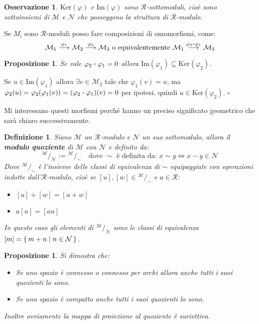 \documentclass[10pt, twoside=false, x11names]{scrbook}
\newtheorem{proposition}[theorem]{Proposizione}
\newtheorem{osservation}[theorem]{Osservazione}
\newtheorem{definition}[theorem]{Definizione}
\newenvironment{proof}{{\textbf{Dimostrazione}:}}{\hfill $\square$}
\newcommand{\R}{\mathcal{R}}
\newcommand{\M}{\mathcal{M}}
\newcommand{\N}{\mathcal{N}}
\newcommand{\im}[1]{\mathrm{Im}( #1 )}
\renewcommand{\ker}[1]{\mathrm{Ker}( #1)}
\newcommand*\quot[2]{{^{\textstyle #1}\big/_{\textstyle #2}}}
\let\latexcirc=\circ
\newcommand{\ccirc}{\mathbin{\mathchoice
  {\xcirc\scriptstyle}
  {\xcirc\scriptstyle}
  {\xcirc\scriptscriptstyle}
  {\xcirc\scriptscriptstyle}
}}
\newcommand{\xcirc}[1]{\vcenter{\hbox{$#1\latexcirc$}}}
\let\circ\ccirc
\let\phi\varphi
\begin{document}
\begin{osservation}
  $ \ker{\phi} $ e $ \im{\phi} $ sono $ \R $-sottomoduli, cioè sono sottoinsiemi di $ \M $ e $ \N $
  che posseggono la struttura di $ \R $-modulo.
\end{osservation}

Se $ M_i $ sono $ \R $-moduli posso fare composizioni di omomorfismi, come:
\[
  \M_1 \overset{\phi_1}{\longrightarrow}  \M_2 \overset{\phi_2}{\longrightarrow}  \M_3
  \text{ o equivalentemente }
  \M_1 \overset{\phi_2 \circ \phi_1}{\longrightarrow} \M_3
\]

\begin{proposition}
  Se vale $ \phi_2 \circ \phi_1 = 0 $ allora $ \im{\phi_1} \subseteq \ker{\phi_2} $.
\end{proposition}
\begin{proof}
  Se $ u \in \im {\phi_1} $ allora $ \exists v \in \M_2 $ tale che $ \phi_1(v) = u $,
  ma $ \phi_2(u) = \phi_2(\phi_1(v)) = (\phi_2 \circ \phi_1)(v) = 0 $ per ipotesi, quindi $ u \in \ker{\phi_2} $.
\end{proof}

Mi interessano questi morfismi perché hanno un preciso significato geometrico che
sarà chiaro successivamente.

\begin{definition}
  Siano $ \M $ un $ \R $-modulo e $ \N $ un suo sottomodulo, allora il \textbf{modulo
    quoziente}  di $ \M $ con $ \N $ e definito da:
  \[
    \quot{\M}{\N} := \quot{\M}{\sim} \quad \text{dove } \sim \text{ è definita da: } x \sim y \Leftrightarrow x - y \in \N
  \]
  Dove $ \quot{\M}{\sim} $ è l'insieme delle classi di equivalenza di $ \sim $ equipaggiate
  con operazioni indotte dall'$ \R $-modulo, cioè se $ [u], [w] \in \quot{\M}{\sim} $ e $ a \in \R $:
  \begin{itemize}
  \item $ [u] + [w] = [u + w] $
  \item $ a [u] = [au] $
  \end{itemize}
  In questo caso gli elementi di $ \quot{\M}{\N} $ sono le classi di equivalenza
  $ [m] = \set{ m + n | n \in \N } $.
\end{definition}

\begin{proposition}
  Si dimostra che:
  \begin{itemize}
  \item Se uno spazio è connesso o connesso per archi allora anche tutti i suoi quozienti lo sono.
  \item Se uno spazio è compatto anche tutti i suoi quozienti lo sono.
  \end{itemize}
  Inoltre ovviamente la mappa di proiezione al quoziente è suriettiva.
\end{proposition}
\end{document}
